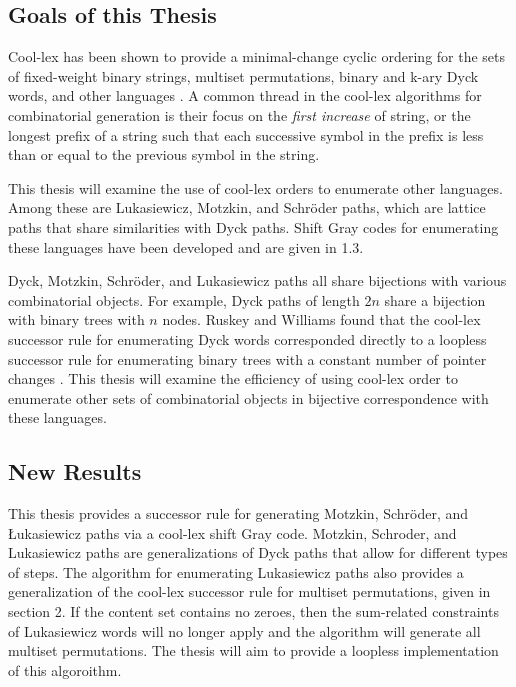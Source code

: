 \subsection{Goals of this Thesis}

Cool-lex has been shown to provide a minimal-change cyclic ordering for the sets of fixed-weight binary strings, multiset permutations, binary and k-ary Dyck words, and other languages \cite{williams2009shift}. A common thread in the cool-lex algorithms for combinatorial generation is their focus on the \emph{first increase} of string, or the longest prefix of a string such that each successive symbol in the prefix is less than or equal to the previous symbol in the string.

This thesis will examine the use of cool-lex orders to enumerate other languages. Among these are Lukasiewicz, Motzkin, and Schröder paths, which are lattice paths that share similarities with Dyck paths. Shift Gray codes for enumerating these languages have been developed and are given in 1.3.

Dyck, Motzkin, Schröder, and Lukasiewicz paths all share bijections with various combinatorial objects. For example, Dyck paths of length $2n$ share a bijection with binary trees with $n$ nodes. Ruskey and Williams found that the cool-lex successor rule for enumerating Dyck words corresponded directly to a loopless successor rule for enumerating binary trees with a constant number of pointer changes \cite{ruskey2008generating}. This thesis will examine the efficiency of using cool-lex order to enumerate other sets of combinatorial objects in bijective correspondence with these languages.  

\subsection{New Results}

This thesis provides a successor rule for generating Motzkin, Schröder, and Łukasiewicz paths via a cool-lex shift Gray code. Motzkin, Schroder, and Lukasiewicz paths are generalizations of Dyck paths that allow for different types of steps. The algorithm for enumerating Lukasiewicz paths also provides a generalization of the cool-lex successor rule for multiset permutations, given in section 2. If the content set contains no zeroes, then the sum-related constraints of Lukasiewicz words will no longer apply and the algorithm will generate all multiset permutations.  The thesis will aim to provide a loopless implementation of this algoroithm.

